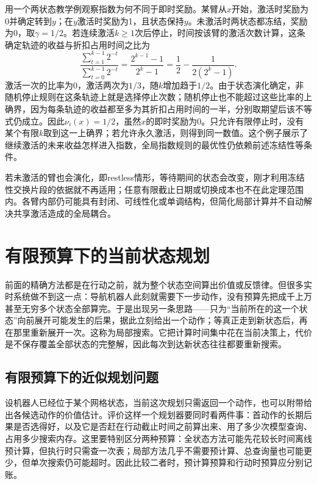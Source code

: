 用一个两状态教学例观察指数为何不同于即时奖励。某臂从$x$开始，激活时奖励为0并确定转到$y$；在$y$激活时奖励为1，且状态保持$y$。未激活时两状态都冻结，奖励为0，取$\gamma=1/2$。若连续激活$k\geq1$次后停止，时间按该臂的激活次数计算，这条确定轨迹的收益与折扣占用时间之比为
\[
 \frac{\sum_{t=1}^{k-1}2^{-t}}{\sum_{t=0}^{k-1}2^{-t}}
 =\frac{2^{k-1}-1}{2^k-1}
 =\frac12-\frac{1}{2(2^k-1)}.
\]
激活一次的比率为0，激活两次为$1/3$，随$k$增加趋于$1/2$。由于状态演化确定，非随机停止规则在这条轨迹上就是选择停止次数；随机停止也不能超过这些比率的上确界，因为每条轨迹的收益都至多为其折扣占用时间的一半，分别取期望后该不等式仍成立。因此$\nu_i(x)=1/2$，虽然$x$的即时奖励为0。只允许有限停止时，没有某个有限$k$取到这一上确界；若允许永久激活，则得到同一数值。这个例子展示了继续激活的未来收益怎样进入指数，全局指数规则的最优性仍依赖前述冻结性等条件。

若未激活的臂也会演化，即restless情形，等待期间的状态会改变，刚才利用冻结性交换片段的依据就不再适用；任意有限截止日期或切换成本也不在此定理范围内。各臂内部仍可能具有封闭、可线性化或单调结构，但简化局部计算并不自动解决共享激活造成的全局耦合。

\section{有限预算下的当前状态规划}
\label{sec:rl-planning-local-search}

前面的精确方法都是在行动之前，就为整个状态空间算出价值或反馈律。但很多实时系统做不到这一点：导航机器人此刻就需要下一步动作，没有预算先把成千上万甚至无穷多个状态全部算完。于是出现另一条思路——只为“当前所在的这一个状态”向前展开可能发生的后果，据此立刻给出一个动作；等真正走到新状态后，再在那里重新展开一次。这称为局部搜索。它把计算时间集中花在当前决策上，代价是不保存覆盖全部状态的完整解，因此每次到达新状态往往都要重新搜索。

\subsection{有限预算下的近似规划问题}
\label{sec:rl-planning-local-budget}

设机器人已经位于某个网格状态，当前这次规划只需返回一个动作，也可以附带给出各候选动作的价值估计。评价这样一个规划器要同时看两件事：首动作的长期后果是否选得好，以及它是否赶在行动截止时间之前算出来、用了多少次模型查询、占用多少搜索内存。这里要特别区分两种预算：全状态方法可能先花较长时间离线预计算，但执行时只需查一次表；局部方法几乎不需要预计算、总查询量也可能更少，但单次搜索仍可能超时。因此比较二者时，预计算预算和行动时预算应分别记账。

